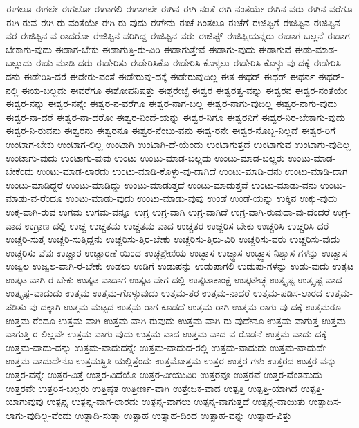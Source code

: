 {ಈಗಲೂ
ಈಗಲೇ
ಈಗಲೋ
ಈಗಾಗಲಿ
ಈಗಾಗಲೇ
ಈಗಿನ
ಈಗಿ-ನಂತೆ
ಈಗಿ-ನಂತೆಯೇ
ಈಗಿನ-ವರು
ಈಗಿನ-ವರೆಗೂ
ಈಗಿ-ರುವ
ಈಗಿ-ರು-ವಂತೆಯೇ
ಈಗಿ-ರು-ವುದು
ಈಗೇನು
ಈಚೆ-ಗಿಂತಲೂ
ಈಚೆಗೆ
ಈಜಿಪ್ಟಿಗೆ
ಈಜಿಪ್ಟಿನ
ಈಜಿಪ್ಟಿನ-ವರ
ಈಜಿಪ್ಟಿನ-ವ-ರಾದರೋ
ಈಜಿಪ್ಟಿನ-ವರಿಗಿದ್ದ
ಈಜಿಪ್ಟಿನ-ವರು
ಈಜಿಪ್ಟ್
ಈಜಿಪ್ಷಿಯನ್ನರು
ಈಡಾಗ-ಬಲ್ಲನೆ
ಈಡಾಗ-ಬೇಕಾಗು-ವುದು
ಈಡಾಗ-ಬೇಕು
ಈಡಾಗುತ್ತಿ-ರು-ವಿರಿ
ಈಡಾಗುತ್ತೇವೆ
ಈಡಾಗು-ವುದು
ಈಡಾಗುವೆ
ಈಡು-ಮಾಡ-ಬಲ್ಲುದು
ಈಡು-ಮಾಡಿ-ದರು
ಈಡೇರಿತು
ಈಡೇರಿಸಿಕೊ
ಈಡೇರಿಸಿ-ಕೊಳ್ಳಲು
ಈಡೇರಿಸಿ-ಕೊಳ್ಳು-ವು-ದಕ್ಕೆ
ಈಡೇರಿಸಿ-ದನು
ಈಡೇರಿಸಿ-ದರೆ
ಈಡೇರು-ವಂತೆ
ಈಡೇರುವು-ದಕ್ಕೆ
ಈಡೇರುವುದಿಲ್ಲ
ಈತ
ಈಥರ್
ಈಥರ್
ಈಥರ್ನ
ಈಥರ್-ನಲ್ಲಿ
ಈಯ-ಬಲ್ಲದು
ಈವರೆಗೂ
ಈಶೋಪನಿಷತ್ತು
ಈಶ್ಚರೇಚ್ಛೆ
ಈಶ್ವರ
ಈಶ್ವರತ್ವ-ವನ್ನು
ಈಶ್ವರನ
ಈಶ್ವರ-ನಂತೆಯೇ
ಈಶ್ವರ-ನನ್ನು
ಈಶ್ವರ-ನನ್ನೇ
ಈಶ್ವರ-ನ-ವರೆಗೂ
ಈಶ್ವರ-ನಾಗ-ಬಲ್ಲ
ಈಶ್ವರ-ನಾಗು-ವುದಿಲ್ಲ
ಈಶ್ವರ-ನಾಗು-ವುದು
ಈಶ್ವರ-ನಾ-ದರೆ
ಈಶ್ವರ-ನಾ-ದರೋ
ಈಶ್ವರ-ನಿಂದೆ-ಯನ್ನು
ಈಶ್ವರ-ನಿಗೂ
ಈಶ್ವರನಿಗೆ
ಈಶ್ವರ-ನಿರ-ಬೇಕಾಗು-ವುದು
ಈಶ್ವರ-ನಿ-ರುವನು
ಈಶ್ವರನು
ಈಶ್ವರನೂ
ಈಶ್ವರ-ನೆಂಬು-ವನು
ಈಶ್ವ-ರನೇ
ಈಶ್ವರ-ನೊಬ್ಬ-ನಿಲ್ಲದೆ
ಈಶ್ವರ-ರಿಗೆ
ಉಂಟಾಗ-ಬೇಕು
ಉಂಟಾಗ-ಲಿಲ್ಲ
ಉಂಟಾಗಿ
ಉಂಟಾಗಿ-ದೆ-ಯೆಂದು
ಉಂಟಾಗುತ್ತದೆ
ಉಂಟಾಗುವ
ಉಂಟಾಗು-ವುದಿಲ್ಲ
ಉಂಟಾಗು-ವುದು
ಉಂಟಾಗು-ವುವು
ಉಂಟು
ಉಂಟು-ಮಾಡ-ಬಲ್ಲದು
ಉಂಟು-ಮಾಡ-ಬಲ್ಲರು
ಉಂಟು-ಮಾಡ-ಬೇಕೆಂದು
ಉಂಟು-ಮಾಡ-ಲಾರದು
ಉಂಟು-ಮಾಡಿ-ಕೊಳ್ಳು-ವು-ದಾಗಿದೆ
ಉಂಟು-ಮಾಡಿ-ದನು
ಉಂಟು-ಮಾಡಿ-ದಾಗ
ಉಂಟು-ಮಾಡಿದ್ದರೆ
ಉಂಟು-ಮಾಡಿದ್ದು
ಉಂಟು-ಮಾಡುತ್ತದೆ
ಉಂಟು-ಮಾಡುತ್ತವೆ
ಉಂಟು-ಮಾಡು-ವನು
ಉಂಟು-ಮಾಡು-ವ-ರೆಂದೂ
ಉಂಟು-ಮಾಡು-ವುದು
ಉಂಟು-ಮಾಡು-ವುವು
ಉಂಡೆ
ಉಂಡೆ-ಯನ್ನು
ಉಕ್ಕಿನ
ಉಕ್ಕು-ವುದು
ಉಕ್ತ-ವಾಗಿ-ರುವ
ಉಗಮ
ಉಗಮ-ವನ್ನೂ
ಉಗ್ರ
ಉಗ್ರ-ವಾಗಿ
ಉಗ್ರ-ವಾಗಿದೆ
ಉಗ್ರ-ವಾಗಿ-ರುವುದಾ-ವು-ದೆಂದರೆ
ಉಗ್ರ-ವಾದ
ಉಗ್ರಾಣ-ದಲ್ಲಿ
ಉಚ್ಚ
ಉಚ್ಚತಮ
ಉಚ್ಚತಮ-ವಾದ
ಉಚ್ಚತರ
ಉಚ್ಚರಿಸ-ಬೇಕು
ಉಚ್ಚರಿಸಿ
ಉಚ್ಚರಿಸಿ-ದರೆ
ಉಚ್ಚರಿ-ಸುತ್ತ
ಉಚ್ಚರಿ-ಸುತ್ತಿದ್ದನು
ಉಚ್ಚರಿಸು-ತ್ತಿರ-ಬೇಕು
ಉಚ್ಚರಿಸು-ತ್ತಿರು-ವಿರಿ
ಉಚ್ಚರಿಸು-ವರು
ಉಚ್ಚರಿಸು-ವುದು
ಉಚ್ಚರಿಸು-ವೆವು
ಉಚ್ಚಾರ
ಉಚ್ಚಾರಣೆ-ಯಿಂದ
ಉಚ್ಛಶ್ರೇಣಿಯ
ಉಚ್ಛಾಸ
ಉಚ್ಛ್ವಾಸ
ಉಚ್ಛ್ವಾಸ-ನಿಶ್ವಾಸ-ಗಳನ್ನು
ಉಚ್ವಾಸ
ಉಜ್ವಲ
ಉಜ್ವಲ-ವಾಗಿ-ರ-ಬೇಕು
ಉಡಲು
ಉಡಿಗೆ
ಉಡುಪನ್ನು
ಉಡುಪಾಗಲಿ
ಉಡುಪು-ಗಳನ್ನು
ಉಡು-ವುದು
ಉತ್ಕಟ
ಉತ್ಕಟ-ವಾಗಿ-ರ-ಬೇಕು
ಉತ್ಕಟ-ವಾದಾಗ
ಉತ್ಕಟ-ವೇಗ-ದಲ್ಲಿ
ಉತ್ಕಟಾಕಾಂಕ್ಷೆ
ಉತ್ಕಟೇಚ್ಛೆ
ಉತ್ಕೃಷ್ಟ
ಉತ್ಕೃಷ್ಟ-ವಾದ
ಉತ್ಕೃಷ್ಟ-ವಾದುದು
ಉತ್ತಮ
ಉತ್ತಮ-ಗೊಳ್ಳುವುದು
ಉತ್ತಮ-ತರ
ಉತ್ತಮ-ನಾದರೆ
ಉತ್ತಮ-ಪಡಿಸ-ಲಾರದ
ಉತ್ತಮ-ಪಡಿಸು-ವು-ದಕ್ಕಾಗಿ
ಉತ್ತಮ-ಮಟ್ಟದ
ಉತ್ತಮ-ರಾಗ-ಕೂಡದೆ
ಉತ್ತಮ-ರಾಗಿ
ಉತ್ತಮ-ರಾಗು-ವು-ದಕ್ಕೆ
ಉತ್ತಮರೂ
ಉತ್ತಮ-ರೆಂದೂ
ಉತ್ತಮ-ವಾಗಿ
ಉತ್ತಮ-ವಾಗಿ-ರುವುದು
ಉತ್ತಮ-ವಾಗಿ-ರು-ವುದೇನೂ
ಉತ್ತಮ-ವಾಗುತ್ತ
ಉತ್ತಮ-ವಾಗುತ್ತಿ-ರ-ಲಿಲ್ಲವೇ
ಉತ್ತಮ-ವಾಗು-ವುದು
ಉತ್ತಮ-ವಾದ
ಉತ್ತಮ-ವಾದ-ವ-ರೊಡನೆ
ಉತ್ತಮ-ವಾದು-ದಕ್ಕೆ
ಉತ್ತಮ-ವಾದು-ದನ್ನು
ಉತ್ತಮ-ವಾದುದನ್ನೇ
ಉತ್ತಮ-ವಾದುದ-ರಲ್ಲಿ
ಉತ್ತಮ-ವಾದುದು
ಉತ್ತಮ-ವಾದುದೇ
ಉತ್ತಮ-ವಾದುದೇನೂ
ಉತ್ತಮಸ್ಥಿತಿ-ಯಲ್ಲಿತ್ತೆಂದು
ಉತ್ತಮೋತ್ತಮ
ಉತ್ತರ
ಉತ್ತರ-ಗಳು
ಉತ್ತರದ
ಉತ್ತರ-ವನ್ನು
ಉತ್ತರ-ವನ್ನೇ
ಉತ್ತರ-ವಿತ್ತೆ
ಉತ್ತರ-ವಿದೆಯೊ
ಉತ್ತರ-ವೀಯುವಿರಿ
ಉತ್ತರವೂ
ಉತ್ತರವೆ
ಉತ್ತರ-ವೆಂತಹುದು
ಉತ್ತರವೇ
ಉತ್ತರಿಸ-ಬಲ್ಲರು
ಉತ್ತಿಷ್ಠತ
ಉತ್ತೀರ್ಣ-ವಾಗಿ
ಉತ್ತೇಜಕ-ವಾದ
ಉತ್ಪತ್ತಿ
ಉತ್ಪತ್ತಿ-ಯಾಗಿದೆ
ಉತ್ಪತ್ತಿ-ಯಾಗುವುವು
ಉತ್ಪನ್ನ
ಉತ್ಪನ್ನ-ವಾಗ-ಲಾರದು
ಉತ್ಪನ್ನ-ವಾಗಲು
ಉತ್ಪನ್ನ-ವಾಗುತ್ತದೆ
ಉತ್ಪನ್ನ-ವಾಯಿತು
ಉತ್ಪಾದಿಸ-ಲಾಗು-ವುದಿಲ್ಲ-ವೆಂದು
ಉತ್ಪಾದಿ-ಸುತ್ತಾ
ಉತ್ಸಾಹ
ಉತ್ಸಾಹ-ದಿಂದ
ಉತ್ಸಾಹ-ವನ್ನು
ಉತ್ಸಾಹ-ವಿತ್ತು
}
